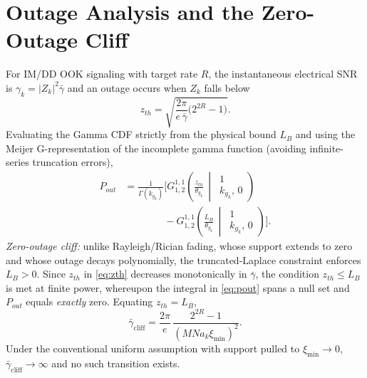 \documentclass[conference]{IEEEtran}
\begin{document}
\section{Outage Analysis and the Zero-Outage Cliff}
\label{sec:outage}
For IM/DD OOK signaling with target rate $R$, the instantaneous electrical
SNR is $\gamma_k=|Z_k|^2\bar{\gamma}$ and an outage occurs when $Z_k$ falls
below
\begin{equation}
z_{th} = \sqrt{\frac{2\pi}{e\,\bar{\gamma}} \bigl( 2^{2R} - 1 \bigr)}.
\label{eq:zth}
\end{equation}
Evaluating the Gamma CDF strictly from the physical bound $L_B$ and using the
Meijer G-representation of the incomplete gamma function (avoiding
infinite-series truncation errors),
\begin{equation}
\begin{aligned}
P_{out} &= \frac{1}{\Gamma(k_{g_k})} \Biggl[
G_{1, 2}^{1, 1}\!\left( \frac{z_{th}}{\theta_{g_k}} \,\middle|\,
\begin{matrix} 1 \\ k_{g_k},\, 0 \end{matrix} \right)\\[2pt]
&\qquad\qquad
- G_{1, 2}^{1, 1}\!\left( \frac{L_B}{\theta_{g_k}} \,\middle|\,
\begin{matrix} 1 \\ k_{g_k},\, 0 \end{matrix} \right) \Biggr].
\end{aligned}
\label{eq:pout}
\end{equation}
\emph{Zero-outage cliff:} unlike Rayleigh/Rician fading, whose support
extends to zero and whose outage decays polynomially, the truncated-Laplace
constraint enforces $L_B>0$. Since $z_{th}$ in \eqref{eq:zth} decreases
monotonically in $\bar{\gamma}$, the condition $z_{th}\le L_B$ is met at
finite power, whereupon the integral in \eqref{eq:pout} spans a null set and
$P_{out}$ equals \emph{exactly} zero. Equating $z_{th}=L_B$,
\begin{equation}
\bar{\gamma}_{\mathrm{cliff}} = \frac{2\pi}{e}\,
\frac{2^{2R} - 1}{\left( M N a_k \xi_{\min} \right)^2}.
\label{eq:cliff}
\end{equation}
Under the conventional uniform assumption with support pulled to
$\xi_{\min}\!\to\!0$, $\bar{\gamma}_{\mathrm{cliff}}\!\to\!\infty$ and no such
transition exists.
\end{document}
